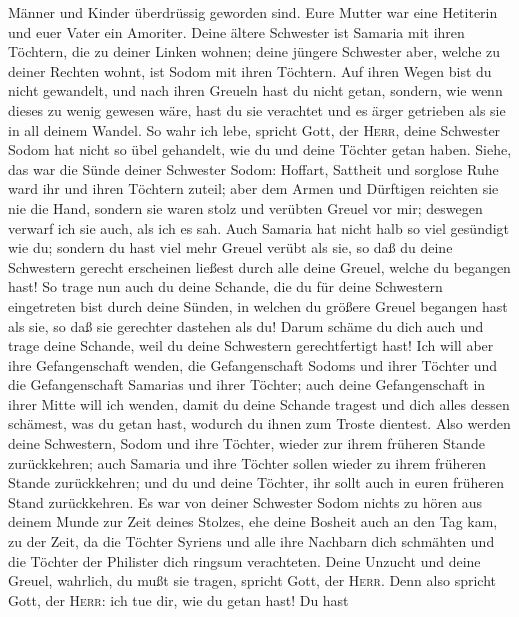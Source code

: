 Männer und Kinder überdrüssig geworden sind. Eure Mutter war eine
Hetiterin und euer Vater ein Amoriter.  Deine ältere
Schwester ist Samaria mit ihren Töchtern, die zu deiner Linken wohnen;
deine jüngere Schwester aber, welche zu deiner Rechten wohnt, ist Sodom
mit ihren Töchtern.  Auf ihren Wegen bist du nicht
gewandelt, und nach ihren Greueln hast du nicht getan, sondern, wie wenn
dieses zu wenig gewesen wäre, hast du sie verachtet und es ärger
getrieben als sie in all deinem Wandel.  So wahr ich
lebe, spricht Gott, der \textsc{Herr}, deine Schwester Sodom hat nicht
so übel gehandelt, wie du und deine Töchter getan haben. 
Siehe, das war die Sünde deiner Schwester Sodom: Hoffart, Sattheit und
sorglose Ruhe ward ihr und ihren Töchtern zuteil; aber dem Armen und
Dürftigen reichten sie nie die Hand,  sondern sie waren
stolz und verübten Greuel vor mir; deswegen verwarf ich sie auch, als
ich es sah.  Auch Samaria hat nicht halb so viel
gesündigt wie du; sondern du hast viel mehr Greuel verübt als sie, so
daß du deine Schwestern gerecht erscheinen ließest durch alle deine
Greuel, welche du begangen hast!  So trage nun auch du
deine Schande, die du für deine Schwestern eingetreten bist durch deine
Sünden, in welchen du größere Greuel begangen hast als sie, so daß sie
gerechter dastehen als du! Darum schäme du dich auch und trage deine
Schande, weil du deine Schwestern gerechtfertigt hast! 
Ich will aber ihre Gefangenschaft wenden, die Gefangenschaft Sodoms und
ihrer Töchter und die Gefangenschaft Samarias und ihrer Töchter; auch
deine Gefangenschaft in ihrer Mitte will ich wenden, 
damit du deine Schande tragest und dich alles dessen schämest, was du
getan hast, wodurch du ihnen zum Troste dientest.  Also
werden deine Schwestern, Sodom und ihre Töchter, wieder zur ihrem
früheren Stande zurückkehren; auch Samaria und ihre Töchter sollen
wieder zu ihrem früheren Stande zurückkehren; und du und deine Töchter,
ihr sollt auch in euren früheren Stand zurückkehren.  Es
war von deiner Schwester Sodom nichts zu hören aus deinem Munde zur Zeit
deines Stolzes,  ehe deine Bosheit auch an den Tag kam,
zu der Zeit, da die Töchter Syriens und alle ihre Nachbarn dich
schmähten und die Töchter der Philister dich ringsum verachteten.
 Deine Unzucht und deine Greuel, wahrlich, du mußt sie
tragen, spricht Gott, der \textsc{Herr}.  Denn also
spricht Gott, der \textsc{Herr}: ich tue dir, wie du getan hast! Du hast
